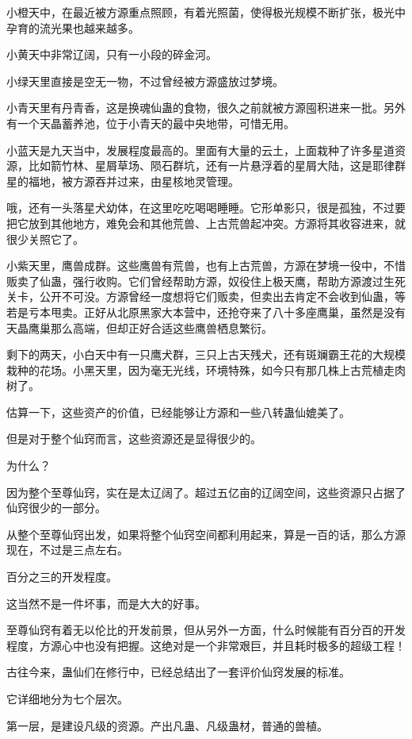 \begin{this_body}
小橙天中，在最近被方源重点照顾，有着光照菌，使得极光规模不断扩张，极光中孕育的流光果也越来越多。

小黄天中非常辽阔，只有一小段的碎金河。

小绿天里直接是空无一物，不过曾经被方源盛放过梦境。

小青天里有丹青香，这是换魂仙蛊的食物，很久之前就被方源囤积进来一批。另外有一个天晶蓄养池，位于小青天的最中央地带，可惜无用。

小蓝天是九天当中，发展程度最高的。里面有大量的云土，上面栽种了许多星道资源，比如箭竹林、星屑草场、陨石群坑，还有一片悬浮着的星屑大陆，这是耶律群星的福地，被方源吞并过来，由星核地灵管理。

哦，还有一头落星犬幼体，在这里吃吃喝喝睡睡。它形单影只，很是孤独，不过要把它放到其他地方，难免会和其他荒兽、上古荒兽起冲突。方源将其收容进来，就很少关照它了。

小紫天里，鹰兽成群。这些鹰兽有荒兽，也有上古荒兽，方源在梦境一役中，不惜贩卖了仙蛊，强行收购。它们曾经帮助方源，奴役住上极天鹰，帮助方源渡过生死关卡，公开不可没。方源曾经一度想将它们贩卖，但卖出去肯定不会收到仙蛊，等若是亏本甩卖。正好从北原黑家大本营中，还抢夺来了八十多座鹰巢，虽然是没有天晶鹰巢那么高端，但却正好合适这些鹰兽栖息繁衍。

剩下的两天，小白天中有一只鹰犬群，三只上古天残犬，还有斑斓霸王花的大规模栽种的花场。小黑天里，因为毫无光线，环境特殊，如今只有那几株上古荒植走肉树了。

估算一下，这些资产的价值，已经能够让方源和一些八转蛊仙媲美了。

但是对于整个仙窍而言，这些资源还是显得很少的。

为什么？

因为整个至尊仙窍，实在是太辽阔了。超过五亿亩的辽阔空间，这些资源只占据了仙窍很少的一部分。

从整个至尊仙窍出发，如果将整个仙窍空间都利用起来，算是一百的话，那么方源现在，不过是三点左右。

百分之三的开发程度。

这当然不是一件坏事，而是大大的好事。

至尊仙窍有着无以伦比的开发前景，但从另外一方面，什么时候能有百分百的开发程度，方源心中也没有把握。这绝对是一个非常艰巨，并且耗时极多的超级工程！

古往今来，蛊仙们在修行中，已经总结出了一套评价仙窍发展的标准。

它详细地分为七个层次。

第一层，是建设凡级的资源。产出凡蛊、凡级蛊材，普通的兽植。


\end{this_body}
